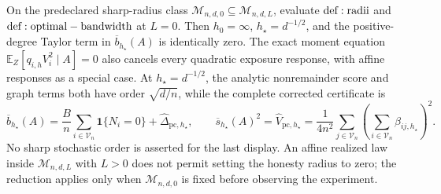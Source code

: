 On the predeclared sharp-radius class \(\mathcal M_{n,d,0}\subseteq\mathcal M_{n,d,L}\), evaluate \({\rm def:radii}\) and \({\rm def:optimal-bandwidth}\) at \(L=0\).  Then \(h_0=\infty\), \(h_\star=d^{-1/2}\), and the positive-degree Taylor term in \(\overline b_{h_\star}(A)\) is identically zero.  The exact moment equation \(\mathbb E_Z[q_{i,h}V_i^2\mid A]=0\) also cancels every quadratic exposure response, with affine responses as a special case.  At \(h_\star=d^{-1/2}\), the analytic nonremainder score and graph terms both have order \(\sqrt{d/n}\), while the complete corrected certificate is
\[
 \overline b_{h_\star}(A)=\frac Bn\sum_{i\in\mathcal V_n}\mathbf1\{N_i=0\}+\widehat\Delta_{\mathrm{pc},h_\star},
 \qquad
 \overline s_{h_\star}(A)^2=\widehat V_{\mathrm{pc},h_\star}
 =\frac1{4n^2}\sum_{j\in\mathcal V_n}
 \left(\sum_{i\in\mathcal V_n}\beta_{ij,h_\star}\right)^2.
\]
No sharp stochastic order is asserted for the last display.  An affine realized law inside \(\mathcal M_{n,d,L}\) with \(L>0\) does not permit setting the honesty radius to zero; the reduction applies only when \(\mathcal M_{n,d,0}\) is fixed before observing the experiment.